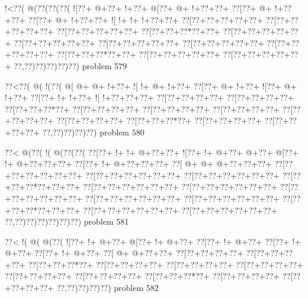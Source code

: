 \vbox{\vbox{\goo
\- !<\0??(\- @(\0??(\0??(\0??(
\- ![\0??+\- @+\0??+\- !+\0??+
\- @[\0??+\- @+\- !+\0??+\0??+
\0??[\0??+\- @+\- !+\0??+\0??+
\0??[\0??+\- @+\- !+\0??+\0??+
\- ![\- !+\- !+\- !+\0??+\0??+
\0??[\0??+\0??+\0??+\0??+\0??+
\0??[\0??+\0??+\0??+\0??+\0??+
\0??[\0??+\0??+\0??+\0??+\0??+
\0??[\0??+\0??+\0??*\0??+\0??+
\0??[\0??+\0??+\0??+\0??+\0??+
\0??[\0??+\0??+\0??+\0??+\0??+
\0??[\0??+\0??+\0??+\0??+\0??+
\0??[\0??+\0??+\0??+\0??+\0??+
\0??[\0??+\0??+\0??+\0??+\0??+
\0??[\0??+\0??+\0??*\0??+\0??+
\0??[\0??+\0??+\0??+\0??+\0??+
\0??[\0??+\0??+\0??+\0??+\0??+
\0??,\0??)\0??)\0??)\0??)\0??)
}
\hfil problem 579\hfil\break
}

\vbox{\vbox{\goo
\0??<\0??(\- @(\- !(\0??(
\- @[\- @+\- @+\- !+\0??+
\- ![\- !+\- @+\- !+\0??+
\0??[\0??+\- @+\- !+\0??+
\- ![\0??+\- @+\- !+\0??+
\0??[\0??+\- !+\- !+\0??+
\- ![\- !+\0??+\0??+\0??+
\0??[\0??+\0??+\0??+\0??+
\0??[\0??+\0??+\0??+\0??+
\0??[\0??+\0??+\0??*\0??+
\0??[\0??+\0??+\0??+\0??+
\0??[\0??+\0??+\0??+\0??+
\0??[\0??+\0??+\0??+\0??+
\0??[\0??+\0??+\0??+\0??+
\0??[\0??+\0??+\0??+\0??+
\0??[\0??+\0??+\0??*\0??+
\0??[\0??+\0??+\0??+\0??+
\0??[\0??+\0??+\0??+\0??+
\0??,\0??)\0??)\0??)\0??)
}
\hfil problem 580\hfil\break
}

\vbox{\vbox{\goo
\0??<\- @(\0??(\- !(\- @(\0??(\0??(
\0??[\0??+\- !+\- !+\- @+\0??+\0??+
\- ![\0??+\- !+\- @+\0??+\- @+\0??+
\- @[\0??+\- !+\- @+\0??+\0??+\0??+
\0??[\0??+\- !+\- @+\0??+\0??+\0??+
\0??[\- @+\- @+\- @+\0??+\0??+\0??+
\0??[\0??+\0??+\0??+\0??+\0??+\0??+
\0??[\0??+\0??+\0??+\0??+\0??+\0??+
\0??[\0??+\0??+\0??+\0??+\0??+\0??+
\0??[\0??+\0??+\0??*\0??+\0??+\0??+
\0??[\0??+\0??+\0??+\0??+\0??+\0??+
\0??[\0??+\0??+\0??+\0??+\0??+\0??+
\0??[\0??+\0??+\0??+\0??+\0??+\0??+
\0??[\0??+\0??+\0??+\0??+\0??+\0??+
\0??[\0??+\0??+\0??+\0??+\0??+\0??+
\0??[\0??+\0??+\0??*\0??+\0??+\0??+
\0??[\0??+\0??+\0??+\0??+\0??+\0??+
\0??[\0??+\0??+\0??+\0??+\0??+\0??+
\0??,\0??)\0??)\0??)\0??)\0??)\0??)
}
\hfil problem 581\hfil\break
}

\vbox{\vbox{\goo
\0??<\- !(\- @(\- @(\0??(
\- ![\0??+\- !+\- @+\0??+
\- @[\0??+\- !+\- @+\0??+
\0??[\0??+\- !+\- @+\0??+
\0??[\0??+\- !+\- @+\0??+
\0??[\0??+\- !+\- @+\0??+
\0??[\- @+\- @+\0??+\0??+
\0??[\0??+\0??+\0??+\0??+
\0??[\0??+\0??+\0??+\0??+
\0??[\0??+\0??+\0??*\0??+
\0??[\0??+\0??+\0??+\0??+
\0??[\0??+\0??+\0??+\0??+
\0??[\0??+\0??+\0??+\0??+
\0??[\0??+\0??+\0??+\0??+
\0??[\0??+\0??+\0??+\0??+
\0??[\0??+\0??+\0??*\0??+
\0??[\0??+\0??+\0??+\0??+
\0??[\0??+\0??+\0??+\0??+
\0??,\0??)\0??)\0??)\0??)
}
\hfil problem 582\hfil\break
}

